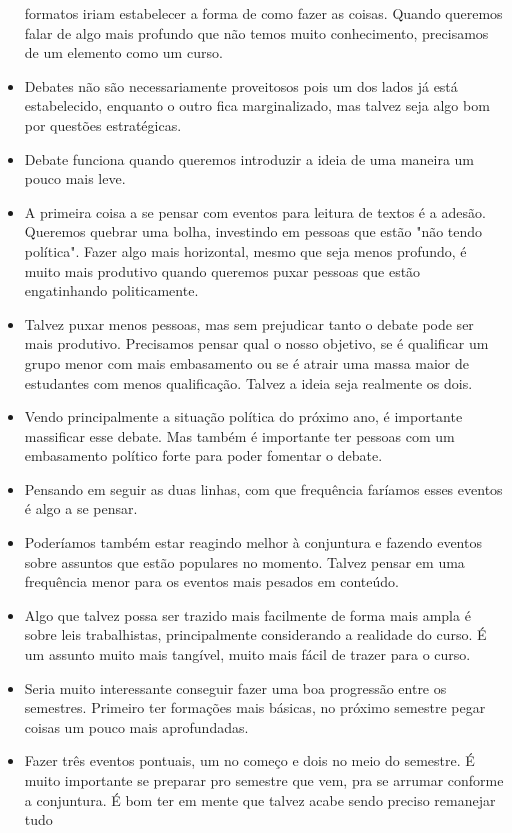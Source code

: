 \documentclass{ata-calico}
\begin{document}
\begin{itemize}
  formatos iriam estabelecer a forma de como fazer as coisas. Quando queremos
  falar de algo mais profundo que não temos muito conhecimento, precisamos de
  um elemento como um curso.
\item Debates não são necessariamente proveitosos pois um dos lados já está
  estabelecido, enquanto o outro fica marginalizado, mas talvez seja algo bom
  por questões estratégicas.
\item Debate funciona quando queremos introduzir a ideia de uma maneira um pouco
  mais leve.
\item A primeira coisa a se pensar com eventos para leitura de textos é a adesão.
  Queremos quebrar uma bolha, investindo em pessoas que estão "não tendo
  política". Fazer algo mais horizontal, mesmo que seja menos profundo, é muito
  mais produtivo quando queremos puxar pessoas que estão engatinhando
  politicamente.
\item Talvez puxar menos pessoas, mas sem prejudicar tanto o debate pode ser mais
  produtivo. Precisamos pensar qual o nosso objetivo, se é qualificar um grupo
  menor com mais embasamento ou se é atrair uma massa maior de estudantes com
  menos qualificação. Talvez a ideia seja realmente os dois.
\item Vendo principalmente a situação política do próximo ano, é importante
  massificar esse debate. Mas também é importante ter pessoas com um
  embasamento político forte para poder fomentar o debate.
\item Pensando em seguir as duas linhas, com que frequência faríamos esses eventos
  é algo a se pensar.
\item Poderíamos também estar reagindo melhor à conjuntura e fazendo eventos sobre
  assuntos que estão populares no momento. Talvez pensar em uma frequência
  menor para os eventos mais pesados em conteúdo.
\item Algo que talvez possa ser trazido mais facilmente de forma mais ampla é sobre
  leis trabalhistas, principalmente considerando a realidade do curso. É um
  assunto muito mais tangível, muito mais fácil de trazer para o curso.
\item Seria muito interessante conseguir fazer uma boa progressão entre os
  semestres. Primeiro ter formações mais básicas, no próximo semestre pegar
  coisas um pouco mais aprofundadas.
\item Fazer três eventos pontuais, um no começo e dois no meio do semestre. É muito
  importante se preparar pro semestre que vem, pra se arrumar conforme a
  conjuntura. É bom ter em mente que talvez acabe sendo preciso remanejar tudo

\end{itemize}
\end{document}
